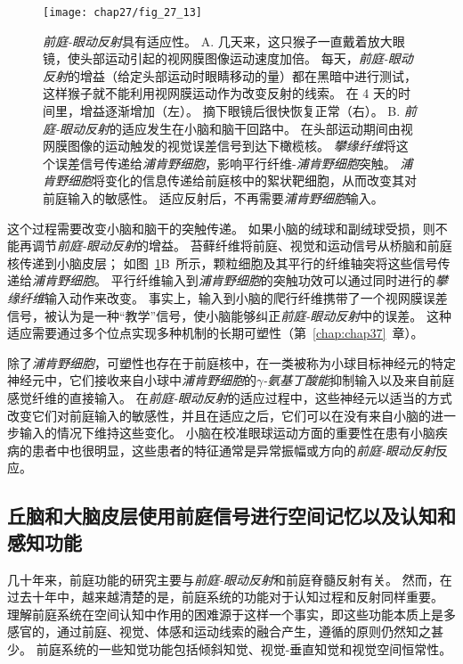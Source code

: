 \begin{figure}[htbp]
	\centering
	\texttt{[image: chap27/fig\_27\_13]}
	\caption{\textit{前庭-眼动反射}具有适应性。
		A. 几天来，这只猴子一直戴着放大眼镜，使头部运动引起的视网膜图像运动速度加倍。
		每天，\textit{前庭-眼动反射}的增益（给定头部运动时眼睛移动的量）都在黑暗中进行测试，这样猴子就不能利用视网膜运动作为改变反射的线索。
		在 4 天的时间里，增益逐渐增加（左）。
		摘下眼镜后很快恢复正常（右）\cite{miles1980long}。
		B. \textit{前庭-眼动反射}的适应发生在小脑和脑干回路中。
		在头部运动期间由视网膜图像的运动触发的视觉误差信号到达下橄榄核。
		\textit{攀缘纤维}将这个误差信号传递给\textit{浦肯野细胞}，影响平行纤维-\textit{浦肯野细胞}突触。
		\textit{浦肯野细胞}将变化的信息传递给前庭核中的絮状靶细胞，从而改变其对前庭输入的敏感性。
		适应反射后，不再需要\textit{浦肯野细胞}输入。}
	\label{fig:27_13}
\end{figure}


这个过程需要改变小脑和脑干的突触传递。
如果小脑的绒球和副绒球受损，则不能再调节\textit{前庭-眼动反射}的增益。
苔藓纤维将前庭、视觉和运动信号从桥脑和前庭核传递到小脑皮层；
如图~\ref{fig:27_13}B~所示，颗粒细胞及其平行的纤维轴突将这些信号传递给\textit{浦肯野细胞}。
平行纤维输入到\textit{浦肯野细胞}的突触功效可以通过同时进行的\textit{攀缘纤维}输入动作来改变。
事实上，输入到小脑的爬行纤维携带了一个视网膜误差信号，被认为是一种“教学”信号，使小脑能够纠正\textit{前庭-眼动反射}中的误差。
这种适应需要通过多个位点实现多种机制的长期可塑性（第~\ref{chap:chap37}~章）。


除了\textit{浦肯野细胞}，可塑性也存在于前庭核中，在一类被称为小球目标神经元的特定神经元中，它们接收来自小球中\textit{浦肯野细胞}的\textit{$\gamma$-氨基丁酸能}抑制输入以及来自前庭感觉纤维的直接输入。
在\textit{前庭-眼动反射}的适应过程中，这些神经元以适当的方式改变它们对前庭输入的敏感性，并且在适应之后，它们可以在没有来自小脑的进一步输入的情况下维持这些变化。
小脑在校准眼球运动方面的重要性在患有小脑疾病的患者中也很明显，这些患者的特征通常是异常振幅或方向的\textit{前庭-眼动反射}反应。



\subsection{丘脑和大脑皮层使用前庭信号进行空间记忆以及认知和感知功能}

几十年来，前庭功能的研究主要与\textit{前庭-眼动反射}和前庭脊髓反射有关。
然而，在过去十年中，越来越清楚的是，前庭系统的功能对于认知过程和反射同样重要。
理解前庭系统在空间认知中作用的困难源于这样一个事实，即这些功能本质上是多感官的，通过前庭、视觉、体感和运动线索的融合产生，遵循的原则仍然知之甚少。
前庭系统的一些知觉功能包括倾斜知觉、视觉-垂直知觉和视觉空间恒常性。


